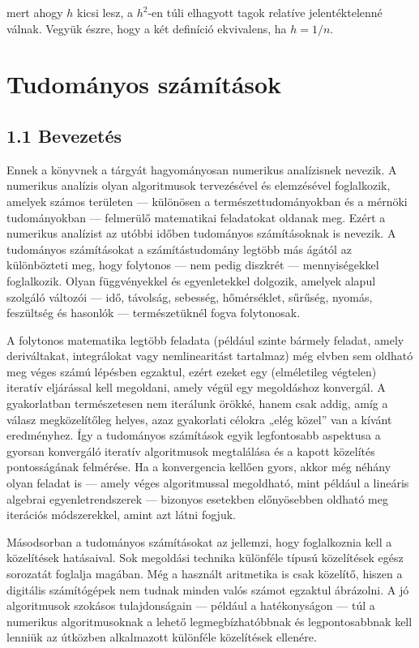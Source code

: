 \documentclass[
  magyar,
  11pt]{article}
\begin{document}
mert ahogy \(h\) kicsi lesz, a \(h^2\)-en túli elhagyott tagok relatíve
jelentéktelenné válnak. Vegyük észre, hogy a két definíció ekvivalens,
ha \(h = 1/n\).

\section{Tudományos számítások}\label{tudomuxe1nyos-szuxe1muxedtuxe1sok}

\subsection{1.1 Bevezetés}\label{bevezetuxe9s}

Ennek a könyvnek a tárgyát hagyományosan numerikus analízisnek nevezik.
A numerikus analízis olyan algoritmusok tervezésével és elemzésével
foglalkozik, amelyek számos területen --- különösen a
természettudományokban és a mérnöki tudományokban --- felmerülő
matematikai feladatokat oldanak meg. Ezért a numerikus analízist az
utóbbi időben tudományos számításoknak is nevezik. A tudományos
számításokat a számítástudomány legtöbb más ágától az különbözteti meg,
hogy folytonos --- nem pedig diszkrét --- mennyiségekkel foglalkozik.
Olyan függvényekkel és egyenletekkel dolgozik, amelyek alapul szolgáló
változói --- idő, távolság, sebesség, hőmérséklet, sűrűség, nyomás,
feszültség és hasonlók --- természetüknél fogva folytonosak.

A folytonos matematika legtöbb feladata (például szinte bármely feladat,
amely deriváltakat, integrálokat vagy nemlinearitást tartalmaz) még
elvben sem oldható meg véges számú lépésben egzaktul, ezért ezeket egy
(elméletileg végtelen) iteratív eljárással kell megoldani, amely végül
egy megoldáshoz konvergál. A gyakorlatban természetesen nem iterálunk
örökké, hanem csak addig, amíg a válasz megközelítőleg helyes, azaz
gyakorlati célokra „elég közel'' van a kívánt eredményhez. Így a
tudományos számítások egyik legfontosabb aspektusa a gyorsan konvergáló
iteratív algoritmusok megtalálása és a kapott közelítés pontosságának
felmérése. Ha a konvergencia kellően gyors, akkor még néhány olyan
feladat is --- amely véges algoritmussal megoldható, mint például a
lineáris algebrai egyenletrendszerek --- bizonyos esetekben előnyösebben
oldható meg iterációs módszerekkel, amint azt látni fogjuk.

Másodsorban a tudományos számításokat az jellemzi, hogy foglalkoznia
kell a közelítések hatásaival. Sok megoldási technika különféle típusú
közelítések egész sorozatát foglalja magában. Még a használt aritmetika
is csak közelítő, hiszen a digitális számítógépek nem tudnak minden
valós számot egzaktul ábrázolni. A jó algoritmusok szokásos
tulajdonságain --- például a hatékonyságon --- túl a numerikus
algoritmusoknak a lehető legmegbízhatóbbnak és legpontosabbnak kell
lenniük az útközben alkalmazott különféle közelítések ellenére.
\end{document}
